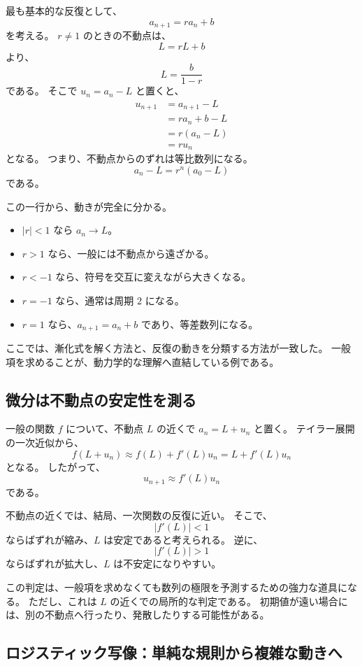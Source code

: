 最も基本的な反復として、
\[
  a_{n+1}=ra_n+b
\]
を考える。
$r\neq1$ のときの不動点は、
\[
  L=rL+b
\]
より、
\[
  L=\frac{b}{1-r}
\]
である。
そこで $u_n=a_n-L$ と置くと、
\[
  \begin{aligned}
    u_{n+1}
     & =a_{n+1}-L \\
     & =ra_n+b-L  \\
     & =r(a_n-L)  \\
     & =ru_n
  \end{aligned}
\]
となる。
つまり、不動点からのずれは等比数列になる。
\[
  a_n-L=r^n(a_0-L)
\]
である。

この一行から、動きが完全に分かる。

\begin{itemize}
  \item $|r|<1$ なら $a_n\to L$。
  \item $r>1$ なら、一般には不動点から遠ざかる。
  \item $r<-1$ なら、符号を交互に変えながら大きくなる。
  \item $r=-1$ なら、通常は周期 $2$ になる。
  \item $r=1$ なら、$a_{n+1}=a_n+b$ であり、等差数列になる。
\end{itemize}

ここでは、漸化式を解く方法と、反復の動きを分類する方法が一致した。
一般項を求めることが、動力学的な理解へ直結している例である。

\subsection{微分は不動点の安定性を測る}

一般の関数 $f$ について、不動点 $L$ の近くで $a_n=L+u_n$ と置く。
テイラー展開の一次近似から、
\[
  f(L+u_n)
  \approx f(L)+f'(L)u_n
  =L+f'(L)u_n
\]
となる。
したがって、
\[
  u_{n+1}\approx f'(L)u_n
\]
である。

不動点の近くでは、結局、一次関数の反復に近い。
そこで、
\[
  |f'(L)|<1
\]
ならばずれが縮み、$L$ は安定であると考えられる。
逆に、
\[
  |f'(L)|>1
\]
ならばずれが拡大し、$L$ は不安定になりやすい。

この判定は、一般項を求めなくても数列の極限を予測するための強力な道具になる。
ただし、これは $L$ の近くでの局所的な判定である。
初期値が遠い場合には、別の不動点へ行ったり、発散したりする可能性がある。

\subsection{ロジスティック写像：単純な規則から複雑な動きへ}

